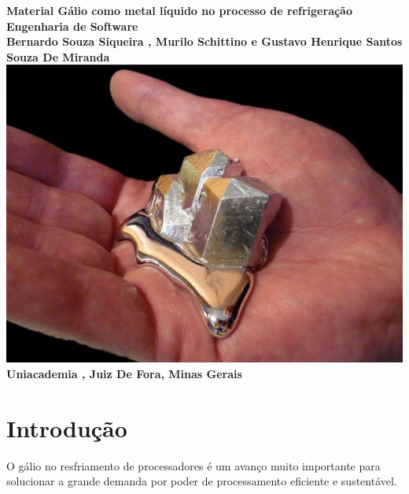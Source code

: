 \documentclass[12pt]{article}
\begin{document}
\pagestyle{fancy}
\fancyhf{}  
\fancyhead[R]{\small \thepage}
\fancyhead[L]{\small \leftmark}



\thispagestyle{empty} 
\begin{center}
    \textbf{Material Gálio como metal líquido no processo de refrigeração}
    \\
    \vspace{0.5cm}
    \textbf{Engenharia de Software}
    \\
    \vspace{0.5cm}
    \textbf{Bernardo Souza Siqueira , Murilo Schittino e Gustavo Henrique Santos Souza De Miranda}
    \\
    \vspace{2cm}
    \includegraphics[width=\textwidth]{gálio.png}
    \\
    \vspace{2cm}
    \textbf{Uniacademia , Juiz De Fora, Minas Gerais}
    
\end{center}
\newpage
\tableofcontents
\newpage
\listoffigures
\newpage

\nocite{*}
\section{Introdução}
O gálio no resfriamento de processadores é um avanço muito importante para solucionar a grande demanda por poder de processamento eficiente e sustentável.
\end{document}
